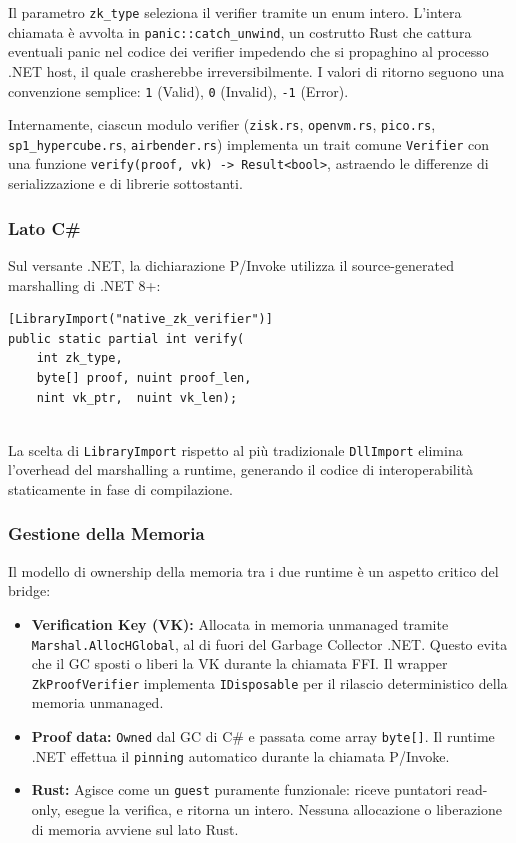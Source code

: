 \documentclass[12pt,a4paper,openright,twoside]{report}
\begin{document}
Il parametro \texttt{zk\_type} seleziona il verifier tramite un enum intero. L'intera chiamata è avvolta in \texttt{panic::catch\_unwind}, un costrutto Rust che cattura eventuali panic nel codice dei verifier impedendo che si propaghino al processo .NET host, il quale crasherebbe irreversibilmente. I valori di ritorno seguono una convenzione semplice: \texttt{1} (Valid), \texttt{0} (Invalid), \texttt{-1} (Error).

Internamente, ciascun modulo verifier (\texttt{zisk.rs}, \texttt{openvm.rs}, \texttt{pico.rs}, \texttt{sp1\_hypercube.rs}, \texttt{airbender.rs}) implementa un trait comune \texttt{Verifier} con una funzione \texttt{verify(proof, vk) -> Result<bool>}, astraendo le differenze di serializzazione e di librerie sottostanti.

\subsubsection{Lato C\#}

Sul versante .NET, la dichiarazione P/Invoke utilizza il source-generated marshalling di .NET 8+:

\begin{minipage}{\textwidth}
\begin{lstlisting}[language={[Sharp]C}, caption={Dichiarazione P/Invoke in C\#}, style=listingsStyle]
[LibraryImport("native_zk_verifier")]
public static partial int verify(
    int zk_type,
    byte[] proof, nuint proof_len,
    nint vk_ptr,  nuint vk_len);
\end{lstlisting}
\end{minipage}
\\

La scelta di \texttt{LibraryImport} rispetto al più tradizionale \texttt{DllImport} elimina l'overhead del marshalling a runtime, generando il codice di interoperabilità staticamente in fase di compilazione.

\subsubsection{Gestione della Memoria}

Il modello di ownership della memoria tra i due runtime è un aspetto critico del bridge:

\begin{itemize}
    \item \textbf{Verification Key (VK):} Allocata in memoria unmanaged tramite \texttt{Marshal.AllocHGlobal}, al di fuori del Garbage Collector .NET. Questo evita che il GC sposti o liberi la VK durante la chiamata FFI. Il wrapper \texttt{ZkProofVerifier} implementa \texttt{IDisposable} per il rilascio deterministico della memoria unmanaged.
    \item \textbf{Proof data:} \texttt{Owned} dal GC di C\# e passata come array \texttt{byte[]}. Il runtime .NET effettua il \texttt{pinning} automatico durante la chiamata P/Invoke.
    \item \textbf{Rust:} Agisce come un \texttt{guest} puramente funzionale: riceve puntatori read-only, esegue la verifica, e ritorna un intero. Nessuna allocazione o liberazione di memoria avviene sul lato Rust.
\end{itemize}
\end{document}
